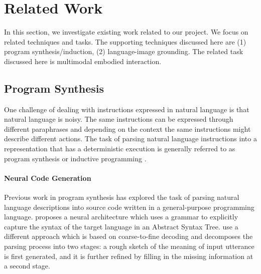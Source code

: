 \documentclass[11pt,a4paper]{article}
\begin{document}


\section{Related Work}
In this section, we investigate existing work related to our project. We focus on related techniques and tasks. The supporting techniques discussed here are (1) program synthesis/induction, (2) language-image grounding. The related task discussed here is multimodal embodied interaction.

\subsection{Program Synthesis}
One challenge of dealing with instructions expressed in natural language is that natural language is noisy. The same instructions can be expressed through different paraphrases and depending on the context the same instructions might describe different actions. The task of parsing natural language instructions into a representation that has a deterministic execution is generally referred to as program synthesis or inductive programming \citep{summers1977methodology, muggleton1994inductive}. 

\paragraph{Neural Code Generation} Previous work in program synthesis has explored the task of parsing natural language descriptions into source code written in a general-purpose programming language. \citet{yin2017syntactic} proposes a neural architecture which uses a grammar to explicitly capture the syntax of the target language in an Abstract Syntax Tree. \citet{dong2018coarse} use a different approach which is based on coarse-to-fine decoding and decomposes the parsing process into two stages: a rough sketch of the meaning of input utterance is first generated, and it is further refined by filling in the missing information at a second stage.
\end{document}
